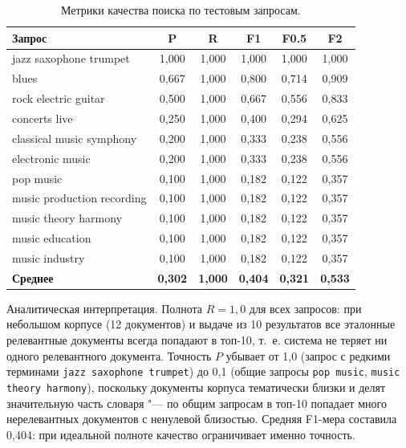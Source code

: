 \begin{table}[H]
	\centering
	\begin{tabular}{|p{5.2cm}|c|c|c|c|c|}
		\hline
		\textbf{Запрос} & \textbf{P} & \textbf{R} & \textbf{F1} & \textbf{F0.5} & \textbf{F2} \\
		\hline
		jazz saxophone trumpet & 1,000 & 1,000 & 1,000 & 1,000 & 1,000 \\
		\hline
		blues & 0,667 & 1,000 & 0,800 & 0,714 & 0,909 \\
		\hline
		rock electric guitar & 0,500 & 1,000 & 0,667 & 0,556 & 0,833 \\
		\hline
		concerts live & 0,250 & 1,000 & 0,400 & 0,294 & 0,625 \\
		\hline
		classical music symphony & 0,200 & 1,000 & 0,333 & 0,238 & 0,556 \\
		\hline
		electronic music & 0,200 & 1,000 & 0,333 & 0,238 & 0,556 \\
		\hline
		pop music & 0,100 & 1,000 & 0,182 & 0,122 & 0,357 \\
		\hline
		music production recording & 0,100 & 1,000 & 0,182 & 0,122 & 0,357 \\
		\hline
		music theory harmony & 0,100 & 1,000 & 0,182 & 0,122 & 0,357 \\
		\hline
		music education & 0,100 & 1,000 & 0,182 & 0,122 & 0,357 \\
		\hline
		music industry & 0,100 & 1,000 & 0,182 & 0,122 & 0,357 \\
		\hline
		\textbf{Среднее} & \textbf{0,302} & \textbf{1,000} & \textbf{0,404} & \textbf{0,321} & \textbf{0,533} \\
		\hline
	\end{tabular}
	\caption{Метрики качества поиска по тестовым запросам.}
	\label{tab:metrics}
\end{table}

Аналитическая интерпретация. Полнота $R = 1{,}0$ для всех запросов: при небольшом
корпусе (12 документов) и выдаче из 10 результатов все эталонные релевантные документы
всегда попадают в топ-10, т.~е. система не теряет ни одного релевантного документа.
Точность $P$ убывает от 1,0 (запрос с редкими терминами \texttt{jazz saxophone trumpet})
до 0,1 (общие запросы \texttt{pop music}, \texttt{music theory harmony}), поскольку
документы корпуса тематически близки и делят значительную часть словаря "--- по общим
запросам в топ-10 попадает много нерелевантных документов с ненулевой близостью.
Средняя F1-мера составила 0,404: при идеальной полноте качество ограничивает именно
точность.

